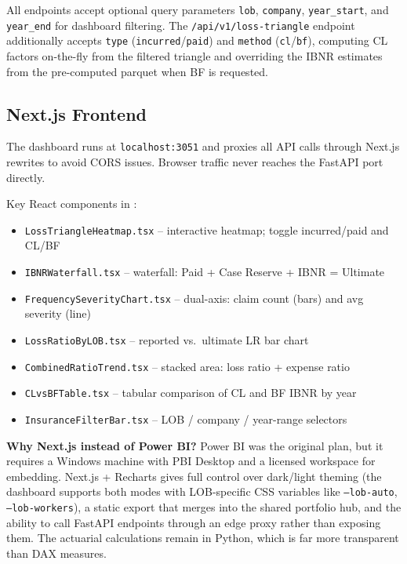 All endpoints accept optional query parameters \texttt{lob}, \texttt{company},
\texttt{year\_start}, and \texttt{year\_end} for dashboard filtering.
The \texttt{/api/v1/loss-triangle} endpoint additionally accepts
\texttt{type} (\texttt{incurred}/\texttt{paid}) and \texttt{method}
(\texttt{cl}/\texttt{bf}), computing CL factors on-the-fly from the filtered
triangle and overriding the IBNR estimates from the pre-computed parquet when
BF is requested.

\subsection{Next.js Frontend}

The dashboard runs at \texttt{localhost:3051} and proxies all API calls through
Next.js rewrites to avoid CORS issues.  Browser traffic never reaches the
FastAPI port directly.

Key React components in
:

\begin{itemize}
  \item \texttt{LossTriangleHeatmap.tsx} -- interactive heatmap; toggle
    incurred/paid and CL/BF
  \item \texttt{IBNRWaterfall.tsx} -- waterfall: Paid + Case Reserve + IBNR = Ultimate
  \item \texttt{FrequencySeverityChart.tsx} -- dual-axis: claim count (bars)
    and avg severity (line)
  \item \texttt{LossRatioByLOB.tsx} -- reported vs.\ ultimate LR bar chart
  \item \texttt{CombinedRatioTrend.tsx} -- stacked area: loss ratio + expense ratio
  \item \texttt{CLvsBFTable.tsx} -- tabular comparison of CL and BF IBNR by year
  \item \texttt{InsuranceFilterBar.tsx} -- LOB / company / year-range selectors
\end{itemize}

\begin{decisionbox}
\textbf{Why Next.js instead of Power BI?}
Power BI was the original plan, but it requires a Windows machine with PBI
Desktop and a licensed workspace for embedding.  Next.js + Recharts gives
full control over dark/light theming (the dashboard supports both modes with
LOB-specific CSS variables like \texttt{--lob-auto}, \texttt{--lob-workers}),
a static export that merges into the shared portfolio hub, and the ability to
call FastAPI endpoints through an edge proxy rather than exposing them.  The actuarial calculations remain in Python,
which is far more transparent than DAX measures.
\end{decisionbox}


